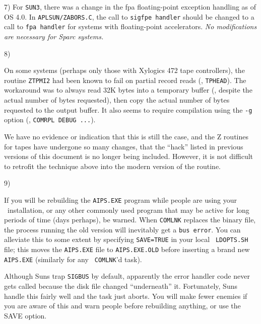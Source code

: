 {{%
\item{7)} For {\tt SUN3}, there was a change in the fpa floating-point
exception handling as of OS 4.0.  In {\tt \dol APLSUN/ZABORS.C}, the call to
{\tt sigfpe handler} should be changed to a call to {\tt fpa handler}
for systems with floating-point accelerators.  {\it No modifications are
necessary for Sparc systems.}


\item{8)} {On some systems (perhaps only those with Xylogics 472 tape
controllers), the routine {\tt ZTPMI2} had been known to fail on partial
record reads (\eg, {\tt TPHEAD}).  The workaround was to always read 32K
bytes into a temporary buffer (\ie, despite the actual number of bytes
requested), then copy the actual number of bytes requested to the output
buffer.  It also seems to require compilation using the {\tt -g} option
(\eg, {\tt COMRPL DEBUG ...}).

We have no evidence or indication that this is still the case, and the Z
routines for tapes have undergone so many changes, that the ``hack''
listed in previous versions of this document is no longer being
included.  However, it is not difficult to retrofit the technique above
into the modern version of the routine.}
\medskip

\item{9)} {If you will be rebuilding the {\tt AIPS.EXE} program while
people are using your \AIPS\ installation, or any other commonly used
program that may be active for long periods of time (days perhaps), be
warned.  When {\tt COMLNK} replaces the binary file, the process running
the old version will inevitably get a {\tt bus error}.  You can alleviate
this to some extent by specifying {\tt SAVE=TRUE} in your local {\tt
LDOPTS.SH} file; this moves the {\tt AIPS.EXE} file to {\tt AIPS.EXE.OLD}
before inserting a brand new {\tt AIPS.EXE} (similarly for any {\tt
COMLNK}'d task).

Although Suns trap {\tt SIGBUS} by default, apparently the error handler
code never gets called because the disk file changed ``underneath'' it.
Fortunately, Suns handle this fairly well and the task just aborts.  You
will make fewer enemies if you are aware of this and warn people before
rebuilding anything, or use the SAVE option.}

}}
